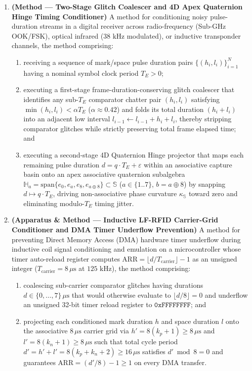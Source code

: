 \documentclass[12pt,letterpaper]{article}
\begin{document}
\begin{enumerate}[leftmargin=20pt,itemsep=4pt]
    \item \textbf{(Method --- Two-Stage Glitch Coalescer and 4D Apex Quaternion Hinge Timing Conditioner)} A method for conditioning noisy pulse-duration streams in a digital receiver across radio-frequency (Sub-GHz OOK/FSK), optical infrared ($38\text{ kHz}$ modulated), or inductive transponder channels, the method comprising:
    \begin{enumerate}[leftmargin=16pt,itemsep=1pt]
        \item receiving a sequence of mark/space pulse duration pairs $\{(h_i, l_i)\}_{i=1}^N$ having a nominal symbol clock period $T_E > 0$;
        \item executing a first-stage frame-duration-conserving glitch coalescer that identifies any sub-$T_E$ comparator chatter pair $(h_i, l_i)$ satisfying $\min(h_i, l_i) < \alpha T_E$ ($\alpha \approx 0.42$) and folds its total duration $(h_i + l_i)$ into an adjacent low interval $l_{i-1} \leftarrow l_{i-1} + h_i + l_i$, thereby stripping comparator glitches while strictly preserving total frame elapsed time; and
        \item executing a second-stage 4D Quaternion Hinge projector that maps each remaining pulse duration $d = q\cdot T_E + \varepsilon$ within an associative capture basin onto an apex associative quaternion subalgebra $\mathbb{H}_a = \mathrm{span}\{e_0, e_a, e_8, e_{a\oplus 8}\} \subset \mathbb{S}$ ($a \in \{1..7\}$, $b = a \oplus 8$) by snapping $d \mapsto q\cdot T_E$, driving non-associative phase curvature $\kappa_{\mathbb{S}}$ toward zero and eliminating modulo-$T_E$ timing jitter.
    \end{enumerate}

    \item \textbf{(Apparatus \& Method --- Inductive LF-RFID Carrier-Grid Conditioner and DMA Timer Underflow Prevention)} A method for preventing Direct Memory Access (DMA) hardware timer underflow during inductive coil signal conditioning and emulation on a microcontroller whose timer auto-reload register computes $\mathrm{ARR} = \lfloor d / T_{\mathrm{carrier}} \rfloor - 1$ as an unsigned integer ($T_{\mathrm{carrier}} = 8\,\mu\text{s}$ at $125\text{ kHz}$), the method comprising:
    \begin{enumerate}[leftmargin=16pt,itemsep=1pt]
        \item coalescing sub-carrier comparator glitches having durations $d \in \{0,\dots,7\}\,\mu\text{s}$ that would otherwise evaluate to $\lfloor d/8 \rfloor = 0$ and underflow an unsigned 32-bit timer reload register to $\mathtt{0xFFFFFFFF}$; and
        \item projecting each conditioned mark duration $h$ and space duration $l$ onto the associative $8\,\mu\text{s}$ carrier grid via $h' = 8(k_p + 1) \ge 8\,\mu\text{s}$ and $l' = 8(k_n + 1) \ge 8\,\mu\text{s}$ such that total cycle period $d' = h' + l' = 8(k_p + k_n + 2) \ge 16\,\mu\text{s}$ satisfies $d' \bmod 8 = 0$ and guarantees $\mathrm{ARR} = (d'/8) - 1 \ge 1$ on every DMA transfer.
    \end{enumerate}


\end{enumerate}
\end{document}

